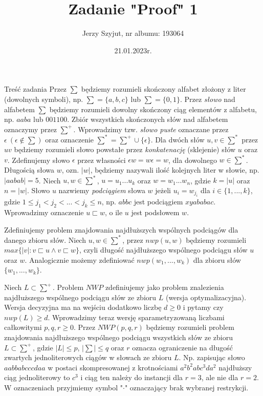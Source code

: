\documentclass{article}
\title{Zadanie "Proof" 1}
\author{Jerzy Szyjut, nr albumu: 193064}
\date{21.01.2023r.}
\begin{document}
\maketitle

\begin{section}
 {Treść zadania}
 Przez $\sum$ będziemy rozumieli skończony alfabet złożony z liter (dowolnych symboli), np. $\sum = \{a, b, c\}$ lub
 $\sum = \{0, 1\}$. Przez \textit{słowo} nad alfabetem $\sum$ będziemy rozumieli dowolny skończony ciąg elementów z alfabetu,
 np. $aaba$ lub $001100$. Zbiór wszystkich skończonych słów nad alfabetem oznaczymy przez $\sum^+$. Wprowadzimy
 tzw. \textit{słowo puste} oznaczane przez $\epsilon \  (\epsilon \notin \sum)$ oraz oznaczenie $\sum^* = \sum^+ \cup \{\epsilon\}$.
 Dla dwóch słów $u, v \in \sum^*$ przez $uv$ będziemy rozumieli słowo powstałe przez \textit{konkatenację} (sklejenie) słów $u$ oraz $v$.
 Zdefinujemy słowo $\epsilon$ przez własności $\epsilon w = w\epsilon = w$, dla dowolnego $w \in \sum^*$. Długością słowa $w$,
 ozn. $|w|$, będziemy nazywali ilość kolejnych liter w słowie, np. $|aabab| = 5$. Niech $u, w \in \sum^*$, $u = u_1 ... u_k$
 oraz $w = w_1 ... w_n$, gdzie $k = |u|$ oraz $n = |w|$. Słowo $u$ nazwiemy \textit{podciągiem} słowa $w$ jeżeli $u_i = w_{j_i}$ dla $i \in \{1, ..., k\}$,
 gdzie $1 \leq j_1 < j_2 < ... < j_k \leq n$, np. $abbc$ jest podciągiem $xyababac$. Wprowadzimy oznaczenie $u \sqsubset w$, o ile $u$ jest
 podsłowem $w$.

 Zdefiniujemy problem znajdowania najdłuższych wspólnych podciągów dla danego zbioru słów. Niech
 $u, w \in \sum^*$, przez $nwp(u, w)$ będziemy rozumieli $max\{|v|: v \sqsubset u \land v \sqsubset w\}$, czyli długość najdłuższego wspólnego
 podciągu słów $u$ oraz $w$. Analogicznie możemy zdefiniować $nwp(w_1, ..., w_k)$ dla zbioru słów $\{w_1, ..., w_k\}$.

 Niech $L \subset \sum^+$. Problem $NWP$ zdefiniujemy jako problem znalezienia najdłuższego wspólnego podciągu
 słów ze zbioru $L$ (wersja optymalizacyjna). Wersja decyzyjna ma na wejściu dodatkowo liczbę $d \geq 0$ i
 pytamy czy $nwp(L) \geq d$. Wprowadzimy teraz wersję sparametryzowaną liczbami całkowitymi $p, q, r \geq 0$.
 Przez $NWP(p,q,r)$ będziemy rozumieli problem znajdowania najdłuższego wspólnego podciągu wszystkich
 słów ze zbioru $L \subset \sum^+$, gdzie $|L| \leq p$, $|\sum| \leq q$ oraz $r$ oznacza ograniczenie na długość zwartych jednoliterowych
 ciągów w słowach ze zbioru $L$. Np. zapisując słowo $aabbabcccdaa$ w postaci skompresowanej z krotnościami
 $a^2b^2abc^3da^2$ najdłuższy ciąg jednoliterowy to $c^3$ i ciąg ten należy do instancji dla $r = 3$, ale nie dla $r = 2$.
 W oznaczeniach przyjmiemy symbol "$\cdot$" oznaczający brak wybranej restrykcji.
\end{section}
\end{document}
